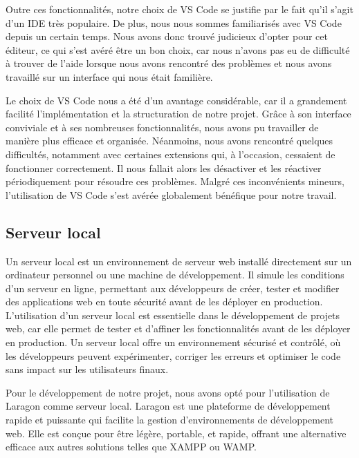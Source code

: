 \par
 Outre ces fonctionnalités, notre choix de VS Code se justifie par le fait qu'il s'agit d'un IDE très populaire\cite{code2019visual}. De plus, nous nous sommes familiarisés avec VS Code depuis un certain temps. Nous avons donc trouvé judicieux d’opter pour cet éditeur, ce qui s’est avéré être un bon choix, car nous n’avons pas eu de difficulté à trouver de l’aide lorsque nous avons rencontré des problèmes et nous avons travaillé sur un interface qui nous était familière. 
\par

Le choix de VS Code nous a été d’un avantage considérable, car il a grandement facilité l'implémentation et la structuration de notre projet. Grâce à son interface conviviale et à ses nombreuses fonctionnalités, nous avons pu travailler de manière plus efficace et organisée. Néanmoins, nous avons rencontré quelques difficultés, notamment avec certaines extensions qui, à l'occasion, cessaient de fonctionner correctement. Il nous fallait alors les désactiver et les réactiver périodiquement pour résoudre ces problèmes. Malgré ces inconvénients mineurs, l'utilisation de VS Code s'est avérée globalement bénéfique pour notre travail.
\par 


\subsection{Serveur local}
Un serveur local est un environnement de serveur web installé directement sur un ordinateur personnel ou une machine de développement. Il simule les conditions d'un serveur en ligne, permettant aux développeurs de créer, tester et modifier des applications web en toute sécurité avant de les déployer en production. L'utilisation d'un serveur local est essentielle dans le développement de projets web, car elle permet de tester et d'affiner les fonctionnalités avant de les déployer en production. Un serveur local offre un environnement sécurisé et contrôlé, où les développeurs peuvent expérimenter, corriger les erreurs et optimiser le code sans impact sur les utilisateurs finaux.

Pour le développement de notre projet, nous avons opté pour l'utilisation de Laragon comme serveur local. Laragon est une plateforme de développement rapide et puissante qui facilite la gestion d'environnements de développement web. Elle est conçue pour être légère, portable, et rapide, offrant une alternative efficace aux autres solutions telles que XAMPP ou WAMP.

